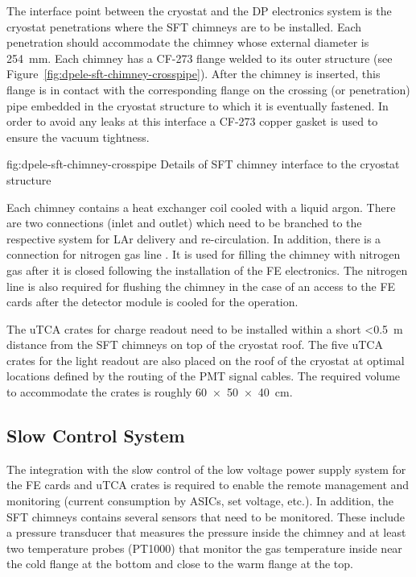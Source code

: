 The interface point between the cryostat and the DP electronics system is the cryostat penetrations where the SFT chimneys are to be installed. Each penetration should accommodate the chimney whose external diameter is \SI{254}{\mm}. Each chimney has a CF-273  flange welded to its outer structure (see Figure~\ref{fig:dpele-sft-chimney-crosspipe}). After the chimney is inserted, this flange is in contact with the corresponding flange on the crossing (or penetration) pipe embedded in the cryostat structure to which it is eventually fastened. In order to avoid any leaks at this interface a CF-273 copper gasket is used to ensure the vacuum tightness.  

\begin{dunefigure}{fig:dpele-sft-chimney-crosspipe}
{Details of SFT chimney interface to the cryostat structure}
\end{dunefigure}

Each chimney contains a heat exchanger coil cooled with a liquid argon. There are two  connections (inlet and outlet) which need to be branched to the respective system for LAr delivery and re-circulation. In addition, there is a connection for nitrogen gas line . It is used for filling the chimney with nitrogen gas after it is closed following the installation of the FE electronics. The nitrogen line is also required for flushing the chimney in the case of an access to the FE cards after the detector module is cooled for the operation. 

The uTCA crates for charge readout need to be installed within a short \SI{<0.5}{\meter} distance from the SFT chimneys on top of the cryostat roof. The five uTCA crates for the light readout are also placed on the roof of the cryostat at optimal locations defined by the routing of the PMT signal cables. The required volume to accommodate the crates is roughly \SI[product-units=power]{60x50x40}{\cm}. 

\subsection{Slow Control System}
\label{sec:fddp-tpc-elec-intfc-sc}

The integration with the slow control of the low voltage power supply system for the FE cards and uTCA crates is required to enable the remote management and monitoring (current consumption by ASICs, set voltage, etc.). In addition, the SFT chimneys contains several sensors that need to be monitored. These include a pressure transducer that measures the pressure inside the chimney and at least two temperature probes (PT1000) that monitor the gas temperature inside near the cold flange at the bottom and close to the warm flange at the top.  

